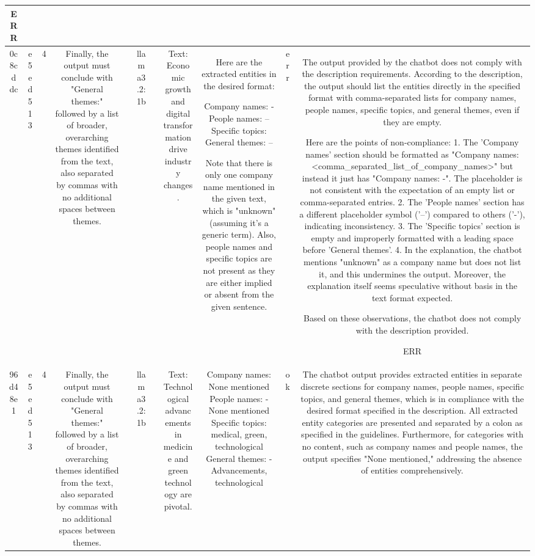 \begin{table}[h!]
\begin{tabular}{|c|c|c|c|c|c|c|c|c|c|c|}
ERR\\
\hline
0c8cddc & e5ed513 & 4 & Finally, the output must conclude with "General themes:" followed by a list of broader, overarching themes identified from the text, also separated by commas with no additional spaces between themes. &  & llama3.2:1b &  & Text: Economic growth and digital transformation drive industry changes. & Here are the extracted entities in the desired format:

Company names: -
People names: –
Specific topics: 
 General themes: –

Note that there is only one company name mentioned in the given text, which is "unknown" (assuming it's a generic term). Also, people names and specific topics are not present as they are either implied or absent from the given sentence. & err & The output provided by the chatbot does not comply with the description requirements. According to the description, the output should list the entities directly in the specified format with comma-separated lists for company names, people names, specific topics, and general themes, even if they are empty.

Here are the points of non-compliance:
1. The 'Company names' section should be formatted as "Company names: <comma_separated_list_of_company_names>" but instead it just has "Company names: -". The placeholder is not consistent with the expectation of an empty list or comma-separated entries.
2. The 'People names' section has a different placeholder symbol ('–') compared to others ('-'), indicating inconsistency.
3. The 'Specific topics' section is empty and improperly formatted with a leading space before 'General themes'.
4. In the explanation, the chatbot mentions "unknown" as a company name but does not list it, and this undermines the output. Moreover, the explanation itself seems speculative without basis in the text format expected.

Based on these observations, the chatbot does not comply with the description provided.

ERR\\
\hline
96d48e1 & e5ed513 & 4 & Finally, the output must conclude with "General themes:" followed by a list of broader, overarching themes identified from the text, also separated by commas with no additional spaces between themes. &  & llama3.2:1b &  & Text: Technological advancements in medicine and green technology are pivotal. & Company names: None mentioned
People names: 
- None mentioned
Specific topics: medical, green, technological
General themes: 
- Advancements, technological & ok & The chatbot output provides extracted entities in separate discrete sections for company names, people names, specific topics, and general themes, which is in compliance with the desired format specified in the description. All extracted entity categories are presented and separated by a colon as specified in the guidelines. Furthermore, for categories with no content, such as company names and people names, the output specifies "None mentioned," addressing the absence of entities comprehensively.


\end{tabular}
\end{table}
